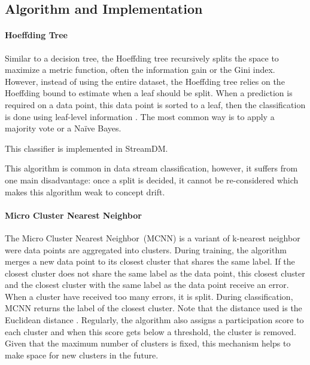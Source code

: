 \subsection{Algorithm and Implementation}
\paragraph{Hoeffding Tree~\cite{VFDT}}
Similar to a decision tree, the Hoeffding tree recursively splits the space to maximize a
metric function, often the
information gain or the Gini index. However,
instead of using the entire dataset, the Hoeffding
tree relies on the Hoeffding bound to estimate
when a leaf should be split. When a prediction is required on a
data point, this data point is sorted to a leaf,
then the classification is done using leaf-level
information . The most common way is to apply a
majority vote or a Naïve Bayes.

This classifier is implemented in StreamDM.

This algorithm is common in data stream
classification, however, it suffers from one main
disadvantage: once a split is decided, it cannot
be re-considered which makes this algorithm weak
to concept drift.

\paragraph{Micro Cluster Nearest Neighbor~\cite{mc-nn}}
The Micro Cluster Nearest Neighbor~(MCNN) is a
variant of k-nearest neighbor were data points are
aggregated into clusters.  During training, the
algorithm merges a new data point to its closest
cluster that shares the same label. If the closest
cluster does not share the same label as the data
point, this closest cluster and the closest
cluster with the same label as the data point
receive an error. When a cluster have received too
many errors, it is split. During classification,
MCNN returns the label of the closest cluster.
Note that the distance used is the Euclidean
distance .
  Regularly, the algorithm also assigns a
participation score to each cluster and when this
score gets below a threshold, the cluster is
removed. Given that the maximum number of clusters
is fixed, this mechanism helps to make space for
new clusters in the future.  

